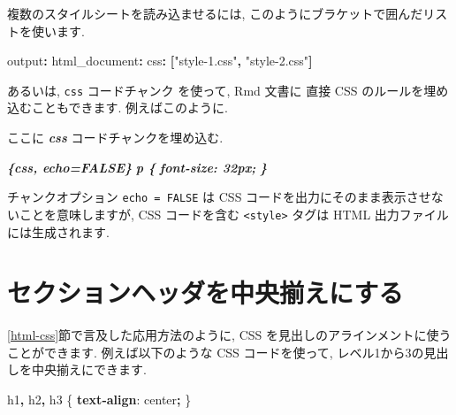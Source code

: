 \documentclass[
  11pt,
  lualatex,
  ja=standard]{bxjsreport}
\newenvironment{Shaded}{\begin{snugshade}}{\end{snugshade}}
\newcommand{\AttributeTok}[1]{\textcolor[rgb]{0.77,0.63,0.00}{#1}}
\newcommand{\DecValTok}[1]{\textcolor[rgb]{0.00,0.00,0.81}{#1}}
\newcommand{\FunctionTok}[1]{\textcolor[rgb]{0.00,0.00,0.00}{#1}}
\newcommand{\InformationTok}[1]{\textcolor[rgb]{0.56,0.35,0.01}{\textbf{\textit{#1}}}}
\newcommand{\KeywordTok}[1]{\textcolor[rgb]{0.13,0.29,0.53}{\textbf{#1}}}
\newcommand{\NormalTok}[1]{#1}
\newcommand{\OperatorTok}[1]{\textcolor[rgb]{0.81,0.36,0.00}{\textbf{#1}}}
\newcommand{\StringTok}[1]{\textcolor[rgb]{0.31,0.60,0.02}{#1}}
\begin{document}
複数のスタイルシートを読み込ませるには, このようにブラケットで囲んだリストを使います.

\begin{Shaded}
\begin{Highlighting}[]
\FunctionTok{output}\KeywordTok{:}
\AttributeTok{  }\FunctionTok{html\_document}\KeywordTok{:}
\AttributeTok{    }\FunctionTok{css}\KeywordTok{:}\AttributeTok{ }\KeywordTok{[}\StringTok{"style{-}1.css"}\KeywordTok{,}\AttributeTok{ }\StringTok{"style{-}2.css"}\KeywordTok{]}
\end{Highlighting}
\end{Shaded}

あるいは, \texttt{css} コードチャンク を使って, Rmd 文書に 直接 CSS のルールを埋め込むこともできます. 例えばこのように.

\begin{Shaded}
\begin{Highlighting}[]
\NormalTok{ここに }\InformationTok{\textasciigrave{}css\textasciigrave{}}\NormalTok{ コードチャンクを埋め込む.}

\InformationTok{\textasciigrave{}\textasciigrave{}\textasciigrave{}\{css, echo=FALSE\}}
\InformationTok{p \{}
\InformationTok{  font{-}size: 32px;}
\InformationTok{\}}
\InformationTok{\textasciigrave{}\textasciigrave{}\textasciigrave{}}
\end{Highlighting}
\end{Shaded}

チャンクオプション \texttt{echo = FALSE} は CSS コードを出力にそのまま表示させないことを意味しますが, CSS コードを含む \texttt{\textless{}style\textgreater{}} タグは HTML 出力ファイルには生成されます.

\hypertarget{center-heading}{%
\section{セクションヘッダを中央揃えにする}\label{center-heading}}

\ref{html-css}節で言及した応用方法のように, CSS を見出しのアラインメントに使うことができます. 例えば以下のような CSS コードを使って, レベル1から3の見出しを中央揃えにできます.

\begin{Shaded}
\begin{Highlighting}[]
\NormalTok{h1}\OperatorTok{,}\NormalTok{ h2}\OperatorTok{,}\NormalTok{ h3 \{}
  \KeywordTok{text{-}align}\NormalTok{: }\DecValTok{center}\OperatorTok{;}
\NormalTok{\}}
\end{Highlighting}
\end{Shaded}
\end{document}
